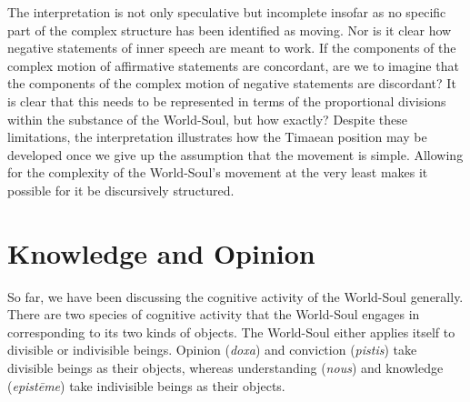 The interpretation is not only speculative but incomplete insofar as no specific part of the complex structure has been identified as moving. Nor is it clear how negative statements of inner speech are meant to work. If the components of the complex motion of affirmative statements are concordant, are we to imagine that the components of the complex motion of negative statements are discordant? It is clear that this needs to be represented in terms of the proportional divisions within the substance of the World-Soul, but how exactly? Despite these limitations, the interpretation illustrates how the Timaean position may be developed once we give up the assumption that the movement is simple. Allowing for the complexity of the World-Soul's movement at the very least makes it possible for it be discursively structured.


\section{Knowledge and Opinion} %
\label{sec:knowledge_and_opinion}

So far, we have been discussing the cognitive activity of the World-Soul generally. There are two species of cognitive activity that the World-Soul engages in corresponding to its two kinds of objects. The World-Soul either applies itself to divisible or indivisible beings. Opinion (\emph{doxa}) and conviction (\emph{pistis}) take divisible beings as their objects, whereas understanding (\emph{nous}) and knowledge (\emph{epistēme}) take indivisible beings as their objects. 

